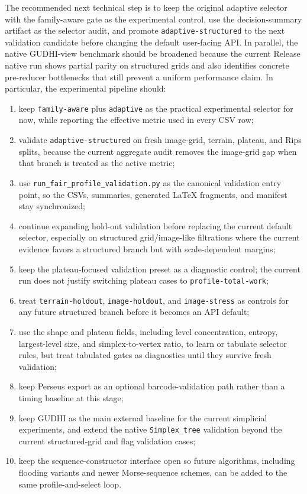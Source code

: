 \documentclass[11pt]{article}
\begin{document}
The recommended next technical step is to keep the original adaptive selector with the
family-aware gate as the experimental control, use the decision-summary artifact as the
selector audit, and promote \texttt{adaptive-structured} to the next validation candidate
before changing the default user-facing API.  In parallel, the native GUDHI-view benchmark
should be broadened because the current Release native run shows partial parity on
structured grids and also identifies concrete pre-reducer bottlenecks that still prevent a
uniform performance claim.
In particular, the experimental pipeline should:
\begin{enumerate}
  \item keep \texttt{family-aware} plus \texttt{adaptive} as the practical experimental
        selector for now, while reporting the effective metric used in every CSV row;
  \item validate \texttt{adaptive-structured} on fresh image-grid, terrain, plateau, and
        Rips splits, because the current aggregate audit removes the image-grid gap when
        that branch is treated as the active metric;
  \item use \texttt{run\_fair\_profile\_validation.py} as the canonical validation entry
        point, so the CSVs, summaries, generated LaTeX fragments, and manifest stay
        synchronized;
  \item continue expanding hold-out validation before replacing the current default
        selector, especially on structured grid/image-like filtrations where the current
        evidence favors a structured branch but with scale-dependent margins;
  \item keep the plateau-focused validation preset as a diagnostic control; the current
        run does not justify switching plateau cases to \texttt{profile-total-work};
  \item treat \texttt{terrain-holdout}, \texttt{image-holdout}, and
        \texttt{image-stress} as controls for any future structured branch before it
        becomes an API default;
  \item use the shape and plateau fields, including level concentration, entropy,
        largest-level size, and simplex-to-vertex ratio, to learn or tabulate selector
        rules, but treat tabulated gates as diagnostics until they survive fresh
        validation;
  \item keep Perseus export as an optional barcode-validation path rather than a timing
        baseline at this stage;
  \item keep GUDHI as the main external baseline for the current simplicial experiments,
        and extend the native \texttt{Simplex\_tree} validation beyond the current
        structured-grid and flag validation cases;
  \item keep the sequence-constructor interface open so future algorithms, including
        flooding variants and newer Morse-sequence schemes, can be added to the same
        profile-and-select loop.
\end{enumerate}
\end{document}

